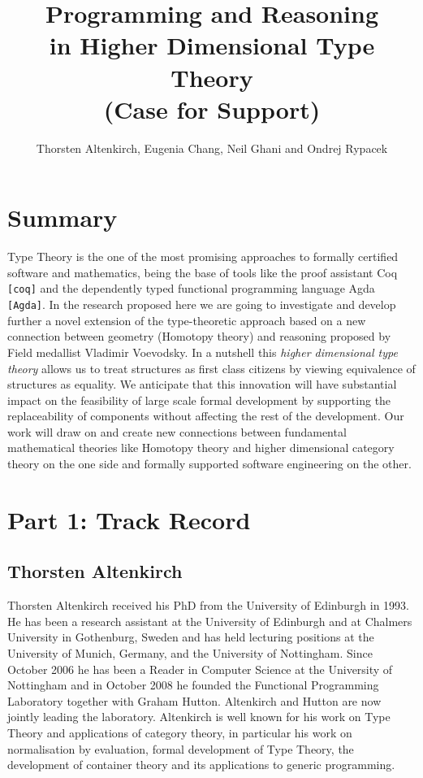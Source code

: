 \documentclass[a4paper]{article}
\title{Programming and Reasoning\\ in Higher Dimensional Type Theory \\
\LARGE (Case for Support)}
\author{Thorsten Altenkirch, Eugenia Chang, Neil Ghani and Ondrej Rypacek}
\date{}
\renewcommand{\cite}[1]{{\tt[#1]}}
\begin{document}
\raggedright
\sffamily

\maketitle
\section*{Summary}
Type Theory is the one of the most promising approaches to formally
certified software and mathematics, being the base of tools like the
proof assistant Coq \cite{coq} and the dependently typed functional
programming language Agda \cite{Agda}. In the research proposed here
we are going to investigate and develop further a novel extension of
the type-theoretic approach based on a new connection between geometry
(Homotopy theory) and reasoning proposed by Field medallist Vladimir
Voevodsky. In a nutshell this \emph{higher dimensional type theory}
allows us to treat structures as first class citizens by viewing
equivalence of structures as equality. We anticipate that this
innovation will have substantial impact on the feasibility of large scale
formal development by supporting the replaceability of components
without affecting the rest of the development. Our work will draw on
and create new connections between fundamental mathematical theories
like Homotopy theory and higher dimensional category theory on the one
side and formally supported software engineering on the other.


\section*{Part 1: Track Record}

\subsection*{Thorsten Altenkirch}
Thorsten Altenkirch received his PhD from the University of
Edinburgh in 1993. He has been a research assistant at the University of
Edinburgh and at Chalmers University in Gothenburg, Sweden and has
held lecturing positions at the University of Munich, Germany, and the
University of Nottingham. Since October 2006 he has been a Reader in
Computer Science at the University of Nottingham and in October
2008 he founded the Functional Programming Laboratory together with
Graham Hutton. Altenkirch and Hutton are now jointly leading the
laboratory. Altenkirch is well known for his work on Type Theory and
applications of category theory, in particular his work on
normalisation by evaluation, formal development of Type Theory, the
development of container theory and its applications to generic
programming. 
\end{document}
